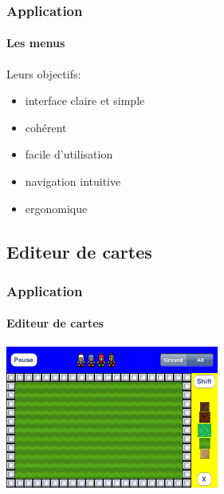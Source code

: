 	\begin{frame}
	\frametitle{Application}
	\framesubtitle{Les menus}
	
		\begin{block}{Leurs objectifs:}
			\begin{itemize}
			  \item interface claire et simple
			  \item cohérent
			  \item facile d'utilisation
			  \item navigation intuitive
			  \item ergonomique
			\end{itemize}
		\end{block}
	\end{frame}
	
\subsection{Editeur de cartes}

	\begin{frame}
		\frametitle{Application}
		\framesubtitle{Editeur de cartes}
			\begin{center}
                             	\includegraphics[width=7cm]{./img/img1.png}
               	\end{center}
	\end{frame}
	

